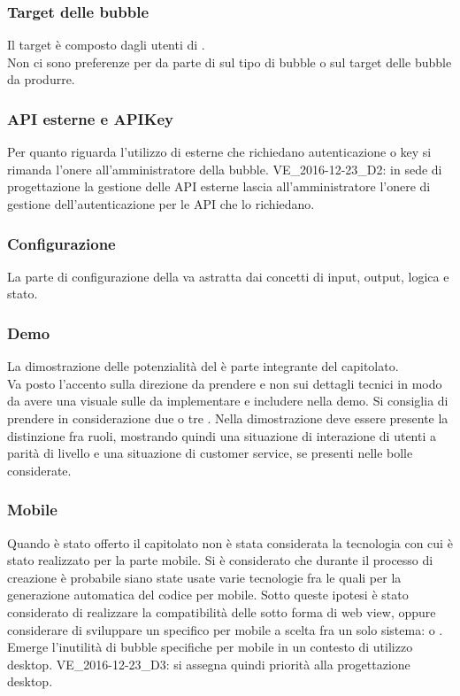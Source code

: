 \subsubsection{Target delle bubble}
Il target è composto dagli utenti di .\\
Non ci sono preferenze per da parte di \Proponente{} sul tipo di bubble o sul target delle bubble da produrre. 

\subsubsection{API esterne e APIKey}
Per quanto riguarda l'utilizzo di  esterne che richiedano autenticazione o key si rimanda l'onere all'amministratore della bubble.
VE\_2016-12-23\_D2: in sede di progettazione la gestione delle API esterne lascia all'amministratore l'onere di gestione dell'autenticazione per le API che lo richiedano.

\subsubsection{Configurazione}
La parte di configurazione della  va astratta dai concetti di input, output, logica e stato.

\subsubsection{Demo}
La dimostrazione delle potenzialità del  è parte integrante del capitolato.\\
Va posto l'accento sulla direzione da prendere e non sui dettagli tecnici in modo da avere una visuale sulle  da implementare e includere nella demo. Si consiglia di prendere in considerazione due o tre .
Nella dimostrazione deve essere presente la distinzione fra ruoli, mostrando quindi una situazione di interazione di utenti a parità di livello e una situazione di customer service, se presenti nelle bolle considerate. 

\subsubsection{Mobile}
Quando è stato offerto il capitolato non è stata considerata la tecnologia con cui  è stato realizzato per la parte mobile. Si è considerato che durante il processo di creazione è probabile siano state usate varie tecnologie fra le quali  per la generazione automatica del codice per mobile. Sotto queste ipotesi è stato considerato di realizzare la compatibilità delle  sotto forma di web view, oppure considerare di sviluppare un  specifico per mobile a scelta fra un solo sistema:  o .  
Emerge l'inutilità di bubble specifiche per mobile in un contesto di utilizzo desktop.
VE\_2016-12-23\_D3: si assegna quindi priorità alla progettazione desktop.

\clearpage
